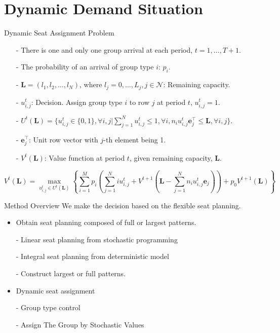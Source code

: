 
\section{Dynamic Demand Situation}
    \frame{\sectionpage}

    \begin{frame}{Dynamic Seat Assignment Problem}
      \centering
      \small
      \begin{itemize}
      \item[-] There is one and only one group arrival at each period, $t = 1, \ldots, T+1$. 
      \item[-] The probability of an arrival of group type $i$: $p_i$.  
      \item[-] $\mathbf{L} = (l_1, l_2, \ldots, l_{N})$, where $l_j =0,\ldots, L_j, j\in \mathcal{N}$: Remaining capacity.
      \item[-] $u_{i,j}^{t}$: Decision. Assign group type $i$ to row $j$ at period $t$, $u_{i,j}^t =1$.
      \item[-] $U^{t}(\mathbf{L}) = \{u_{i,j}^{t} \in\{0,1\}, \forall i,j| \sum_{j=1}^{N} u_{i,j}^{t} \leq 1, \forall i, n_{i}u_{i,j}^{t}\mathbf{e}_j^{\top} \leq \mathbf{L}, \forall i,j \}$.
      \item[-] $\mathbf{e}_j^{\top}$: Unit row vector with $j$-th element being 1.
      \item[-] $V^{t}(\mathbf{L})$: Value function at period $t$, given remaining capacity, $\mathbf{L}$.
      \end{itemize}
  
      $$V^{t}(\mathbf{L}) = \max_{u_{i,j}^{t} \in U^{t}(\mathbf{L})}\left\{ \sum_{i=1}^{M} p_i ( \sum_{j=1}^{N} i u_{i,j}^{t} + V^{t+1}(\mathbf{L}- \sum_{j=1}^{N} n_i u_{i,j}^{t}\mathbf{e}_j)) + p_0 V^{t+1}(\mathbf{L})\right\}$$
      \small
  \end{frame}

  \begin{frame}{Method Overview}
    We make the decision based on the flexible seat planning.
    \begin{itemize}
      \item Obtain seat planning composed of full or largest patterns.
      
      - Linear seat planning from stochastic programming
      
      - Integral seat planning from deterministic model
  
      - Construct largest or full patterns.
  
      \item Dynamic seat assignment
  
      - Group type control
  
      - Assign The Group by Stochastic Values
    \end{itemize}
  \end{frame}
    
